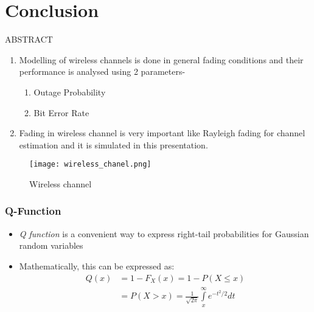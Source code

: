 \documentclass{beamer}
\begin{document}
\section{Conclusion}
\begin{frame}{ABSTRACT}
\begin{block}{}
\begin{enumerate}
    \item Modelling of wireless channels is done in general fading conditions and their performance is  analysed using 2 parameters-
    \begin{enumerate}
        \item Outage Probability
        \item Bit Error Rate
    \end{enumerate}
    \item Fading in wireless channel is very important like Rayleigh fading for channel estimation and it is simulated in this presentation.\\
\end{enumerate}

\end{block}
\begin{figure}
        \centering
        \texttt{[image: wireless\_chanel.png]}
        \caption{Wireless channel}
    \end{figure}
\end{frame}





\frame
{
  \frametitle{Q-Function}

  \begin{itemize}
   \item \textit{Q function} is a convenient way to express right-tail probabilities for Gaussian random variables
   \item Mathematically, this can be expressed as:
   \begin{eqnarray}
    Q(x)&=1-F_X(x)=1-P(X\le{x})\\
    &=P(X>x)=\frac{1}{\sqrt{2\pi}}\int\limits_{x}^{\infty}e^{-t^2/2}dt
   \end{eqnarray}
  \end{itemize}

  }


\end{document}
